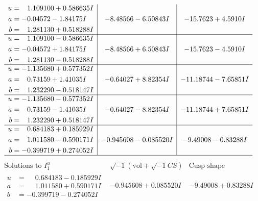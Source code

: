 \documentclass[1p]{elsarticle_modified}
\theoremstyle{definition}
\newcommand{\I}{\sqrt{-1}}
\begin{document}
$$\begin{array}{c|c|c}
\begin{aligned}
u &= \phantom{-}1.109100 + 0.586635 I \\
a &= -0.04572 - 1.84175 I \\
b &= \phantom{-}1.281130 + 0.518288 I\end{aligned}
 & -8.48566 - 6.50843 I & -15.7623 + 4.5910 I \\ \hline\begin{aligned}
u &= \phantom{-}1.109100 - 0.586635 I \\
a &= -0.04572 + 1.84175 I \\
b &= \phantom{-}1.281130 - 0.518288 I\end{aligned}
 & -8.48566 + 6.50843 I & -15.7623 - 4.5910 I \\ \hline\begin{aligned}
u &= -1.135680 + 0.577352 I \\
a &= \phantom{-}0.73159 + 1.41035 I \\
b &= \phantom{-}1.232290 - 0.518147 I\end{aligned}
 & -0.64027 + 8.82354 I & -11.18744 - 7.65851 I \\ \hline\begin{aligned}
u &= -1.135680 - 0.577352 I \\
a &= \phantom{-}0.73159 - 1.41035 I \\
b &= \phantom{-}1.232290 + 0.518147 I\end{aligned}
 & -0.64027 - 8.82354 I & -11.18744 + 7.65851 I \\ \hline\begin{aligned}
u &= \phantom{-}0.684183 + 0.185929 I \\
a &= \phantom{-}1.011580 - 0.590171 I \\
b &= -0.399719 + 0.274052 I\end{aligned}
 & -0.945608 - 0.085520 I & -9.49008 - 0.83288 I\\
 \hline 
 \end{array}$$\newpage$$\begin{array}{c|c|c}  
\text{Solutions to }I^u_{1}& \I (\text{vol} + \sqrt{-1}CS) & \text{Cusp shape}\\
 \hline 
\begin{aligned}
u &= \phantom{-}0.684183 - 0.185929 I \\
a &= \phantom{-}1.011580 + 0.590171 I \\
b &= -0.399719 - 0.274052 I\end{aligned}
 & -0.945608 + 0.085520 I & -9.49008 + 0.83288 I \\ \hline\begin{aligned}

\end{aligned}
\end{array}$$
\end{document}

